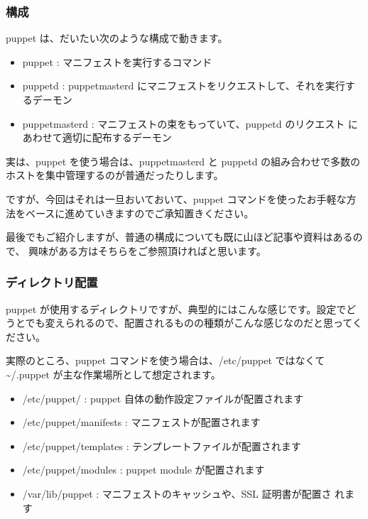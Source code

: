 \documentclass[mingoth,a4paper]{jsarticle}
\begin{document}
\subsubsection{構成}

puppet は、だいたい次のような構成で動きます。

\begin{itemize}
\item puppet : マニフェストを実行するコマンド
\item puppetd : puppetmasterd にマニフェストをリクエストして、それを実行するデーモン
\item puppetmasterd : マニフェストの束をもっていて、puppetd のリクエスト
      にあわせて適切に配布するデーモン
\end{itemize}

実は、puppet を使う場合は、puppetmasterd と puppetd の組み合わせで多数の
ホストを集中管理するのが普通だったりします。

ですが、今回はそれは一旦おいておいて、puppet コマンドを使ったお手軽な方
法をベースに進めていきますのでご承知置きください。

最後でもご紹介しますが、普通の構成についても既に山ほど記事や資料はあるので、
興味がある方はそちらをご参照頂ければと思います。

\newpage
\subsubsection{ディレクトリ配置}

puppet が使用するディレクトリですが、典型的にはこんな感じです。設定でど
うとでも変えられるので、配置されるものの種類がこんな感じなのだと思ってく
ださい。

実際のところ、puppet コマンドを使う場合は、/etc/puppet ではなくて
\textasciitilde /.puppet が主な作業場所として想定されます。

\begin{itemize}
 \item /etc/puppet/ : puppet 自体の動作設定ファイルが配置されます
 \item /etc/puppet/manifests : マニフェストが配置されます
 \item /etc/puppet/templates : テンプレートファイルが配置されます
 \item /etc/puppet/modules : puppet module が配置されます
 \item /var/lib/puppet : マニフェストのキャッシュや、SSL 証明書が配置さ
       れます
\end{itemize}
\end{document}
